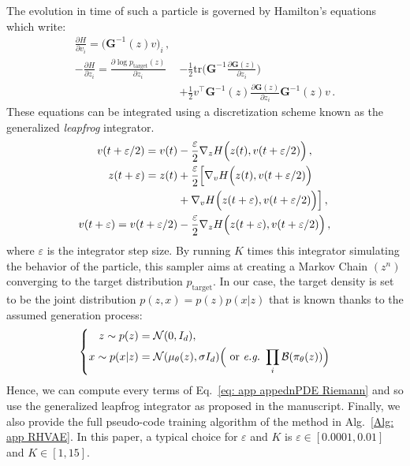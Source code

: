 \documentclass[10pt,journal,compsoc]{IEEEtran}
\begin{document}
     
     The evolution in time of such a particle is governed by Hamilton's equations which write:
     \begin{equation}\label{eq: app appednPDE Riemann}\begin{aligned}
        \frac{\partial H}{\partial v_i} = \big( \mathbf{G}^{-1}(z) v \big)_i \,, \\
        - \frac{\partial H}{\partial z_i} = \frac{\partial \log p_{\mathrm{target}}(z)}{\partial z_i} &- \frac{1}{2} \mathrm{tr} \Biggl(\mathbf{G}^{-1} \frac{\partial \mathbf{G}(z)}{\partial z_i} \Biggr)\\ 
        &+ \frac{1}{2} v^{\top} \mathbf{G}^{-1}(z) \frac{\partial \mathbf{G}(z)}{\partial z_i} \mathbf{G}^{-1}(z) v \,.
    \end{aligned} 
    \end{equation}
    These equations can be integrated using a discretization scheme known as the generalized \emph{leapfrog} integrator.
     \begin{equation}\label{Eq: app appendix Riemann Stormer Verlet}
        \begin{aligned}
            v(t + \varepsilon/2) = v(t) &- \frac{\varepsilon}{2} \nabla_z H\Bigl(z(t), v(t+\varepsilon/2)\Bigr)\,,\\
            z(t + \varepsilon)      = z(t) &+ \frac{\varepsilon}{2} \Bigl[\nabla_{v} H\Bigl(z(t), v(t + \varepsilon/2)\Bigr) \\&+ \nabla_{v} H\Bigl(z(t+\varepsilon),  v(t + \varepsilon/2)\Bigr)\Bigr]\,,\\
            v(t + \varepsilon)   = v(t + \varepsilon/2) &- \frac{\varepsilon}{2} \nabla_z H \Bigl(z(t+\varepsilon), v(t+ \varepsilon/2) \Bigr)\,,
        \end{aligned}
    \end{equation}
    where $\varepsilon$ is the integrator step size. By running $K$ times this integrator simulating the behavior of the particle, this sampler aims at creating a Markov Chain $(z^n)$ converging to the target distribution $p_{\mathrm{target}}$. In our case, the target density is set to be the joint distribution $p(z, x) = p(z) p(x|z)$ that is known thanks to the assumed generation process:
    \[\left\{\begin{aligned}
    z\sim p(z) &= \mathcal{N}(0, I_d),\\ x\sim p(x|z) &=\mathcal{N}(\mu_{\theta}(z), \sigma I_d) \Big(~\text{or}~ \emph{e.g.}~\prod_i \mathcal{B}(\pi_{\theta}(z))\Big)
     \end{aligned}\right.
    \]Hence, we can compute every terms of Eq.~\eqref{eq: app appednPDE Riemann} and so use the generalized leapfrog integrator as proposed in the manuscript.
    Finally, we also provide the full pseudo-code training algorithm of the method in Alg.~\ref{Alg: app RHVAE}. In this paper, a typical choice for $\varepsilon$ and $K$ is $\varepsilon \in [0.0001, 0.01]$ and $K\in[1, 15]$.
    
\end{document}
